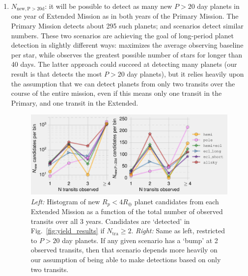 \begin{enumerate}
	\item $N_\mathrm{new,P>20d}$: it will be possible to detect as many new 
	$P>20$ day planets in one year of \tesss Extended Mission as in both years 
	of the Primary Mission.
	The Primary Mission detects about 295 such planets; \hemis\:and 
	\npole\:scenarios detect similar numbers.
	These two scenarios are achieving the goal of long-period planet detection 
	in slightly different ways: %
	\npole\:maximizes the average observing baseline per star, while 
	\hemis\:observes the greatest possible number of stars for longer than 40 
	days.
	The latter approach could succeed at detecting many planets (our result is 
	that \hemis\:detects the most $P>20$ day planets), but it relies heavily 
	upon the assumption that we can detect planets from only two transits over 
	the course of the entire mission, even if this means only one transit in 
	the Primary, and one transit in the Extended.
	\begin{figure}[!t]
		\centering
		\includegraphics{figures/Ntra_histogram.pdf}
		\caption{ \textit{Left:} Histogram of new $R_p<4R_\oplus$ planet 
			candidates from each Extended Mission as a function of the 
			total number of 
			observed transits over all 3 years.
			Candidates are `detected' in 
			Fig.~\protect\ref{fig:yield_results} if $N_\mathrm{tra}\geq2$.
			\textit{Right:} Same as left, restricted to $P>20$ day planets.
			If any given scenario has a `bump' at 2 observed transits, then 
			that scenario depends more heavily on our assumption of being 
			able to make detections based on only two transits.
}
\end{figure}
\end{enumerate}
